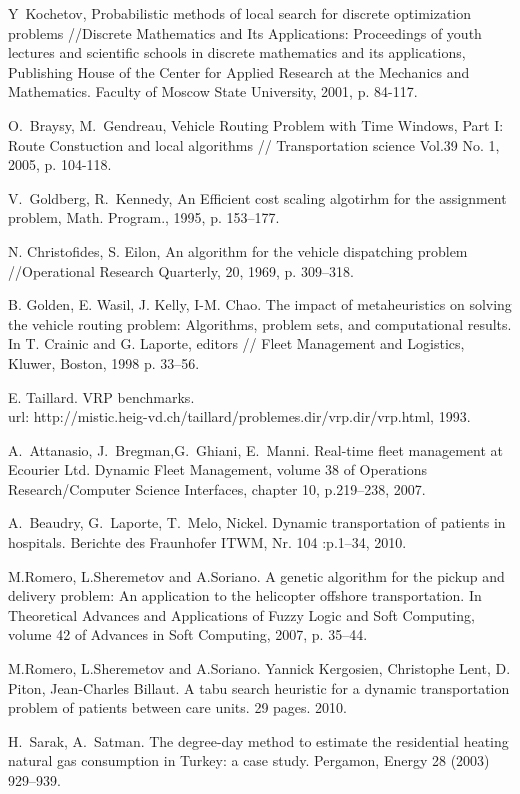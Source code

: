 \documentclass[]{TAACpaper}
\begin{document}
\begin{thebibliography}{99}
   Y~Kochetov, Probabilistic methods of local search for discrete optimization problems //Discrete Mathematics and Its Applications: Proceedings of youth lectures and scientific schools in discrete mathematics and its applications, Publishing House of the Center for Applied Research at the Mechanics and Mathematics. Faculty of Moscow State University, 2001, p. 84-117.  

 O.~Braysy, M.~Gendreau, Vehicle Routing Problem with Time Windows, Part I: Route Constuction and local algorithms // Transportation science Vol.39 No. 1, 2005, p. 104-118.

 V.~Goldberg, R.~Kennedy, An Efficient cost scaling algotirhm for the assignment problem, Math. Program., 1995, p. 153--177.  

  N. Christofides, S. Eilon, An algorithm for the vehicle dispatching problem //Operational Research Quarterly, 20, 1969, p. 309–318.

  B. Golden, E. Wasil, J. Kelly, I-M. Chao. The impact of metaheuristics on solving the vehicle routing problem: Algorithms, problem sets, and computational results. In T. Crainic and G. Laporte, editors // Fleet Management and Logistics, Kluwer, Boston, 1998 p. 33–56.

  E. Taillard. VRP benchmarks.\\ url: http://mistic.heig-vd.ch/taillard/problemes.dir/vrp.dir/vrp.html, 1993.

 A.~Attanasio, J.~Bregman,G.~Ghiani, E.~Manni. Real-time fleet management at Ecourier Ltd. Dynamic Fleet Management, volume 38 of Operations Research/Computer Science Interfaces, chapter 10, p.219--238, 2007.

 A.~Beaudry, G.~Laporte, T.~Melo, Nickel. Dynamic transportation of patients in hospitals. Berichte des Fraunhofer ITWM, Nr. 104 :p.1--34, 2010.

 M.Romero, L.Sheremetov and A.Soriano. A genetic algorithm for the pickup and delivery problem: An application to the helicopter offshore transportation. In Theoretical Advances and Applications of Fuzzy Logic and Soft Computing, volume 42 of Advances in Soft Computing, 2007, p. 35--44.

 M.Romero, L.Sheremetov and A.Soriano. Yannick Kergosien, Christophe Lent, D. Piton, Jean-Charles Billaut. A tabu search heuristic for a dynamic transportation problem of patients between care units. 29 pages. 2010.

 H.~Sarak, A.~Satman. The degree-day method to estimate the residential heating natural gas consumption in Turkey: a case study. Pergamon, Energy 28 (2003) 929--939.
	
\end{thebibliography}
\end{document}
